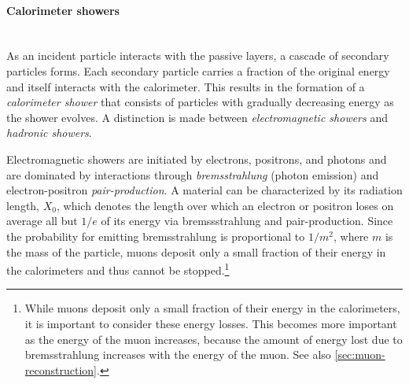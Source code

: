 

\paragraph{Calorimeter showers}\mbox{}\\
As an incident particle interacts with the passive layers, a cascade of secondary particles forms.
Each secondary particle carries a fraction of the original energy and itself interacts with the calorimeter. This results in the formation of a \emph{calorimeter shower} that consists of particles with gradually decreasing energy as the shower evolves.
A distinction is made between \emph{electromagnetic showers} and \emph{hadronic showers}.

Electromagnetic showers are initiated by electrons, positrons, and photons and are dominated by interactions through \emph{bremsstrahlung} (photon emission) and electron-positron \emph{pair-production}.
A material can be characterized by its radiation length, $X_0$, which denotes the length over which an electron or positron loses on average all but  $1/e$ of its energy via bremssstrahlung and pair-production. Since the probability for emitting bremsstrahlung is proportional to $1 / m^2$, where $m$ is the mass of the particle, muons deposit only a small fraction of their energy in the calorimeters and thus cannot be stopped.\footnote{While muons deposit only a small fraction of their energy in the calorimeters, it is important to consider these energy losses. This becomes more important as the energy of the muon increases, because the amount of energy lost due to bremsstrahlung increases with the energy of the muon. See also \cref{sec:muon-reconstruction}.}

